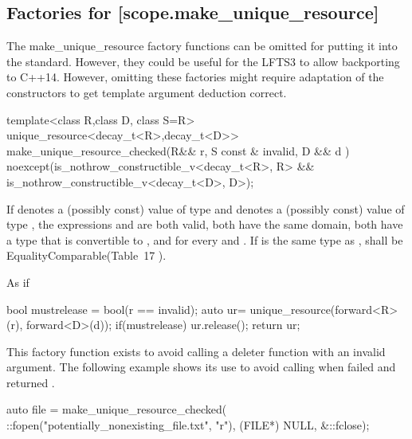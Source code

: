 \documentclass[ebook,11pt,article]{memoir}
\begin{document}
\subsection {Factories for  [scope.make_unique_resource]}

\begin{note}
The make_unique_resource factory functions can be omitted for putting it into the standard. However, they could be useful for the LFTS3 to allow backporting to C++14.
However, omitting these factories might require adaptation of the constructors to get template argument deduction correct.
\end{note}



\begin{itemdecl}
template<class R,class D, class S=R>
unique_resource<decay_t<R>,decay_t<D>>
make_unique_resource_checked(R&& r, S const & invalid, D && d ) 
noexcept(is_nothrow_constructible_v<decay_t<R>, R> &&
         is_nothrow_constructible_v<decay_t<D>, D>);
\end{itemdecl}

\begin{itemdescr}
\pnum
\requires 
If  denotes a (possibly const) value of type  and  denotes a
(possibly const) value of type , the expressions  and 
are both valid, both have the same domain, both have a type that is
convertible to , and  for every  and
. If  is the same type as ,  shall be EqualityComparable(Table~17
). 

\pnum
\effects As if
\begin{codeblock}
  bool mustrelease = bool(r == invalid);
  auto ur= unique_resource(forward<R>(r), forward<D>(d));
  if(mustrelease) ur.release();
  return ur;
\end{codeblock}

\pnum
\begin{note}
This factory function exists to avoid calling a deleter function with an invalid argument. The following example shows its use to avoid calling  when  failed and returned .
\end{note}

\pnum
\begin{example}
\begin{codeblock}
		auto file = make_unique_resource_checked(
		      ::fopen("potentially_nonexisting_file.txt", "r"), 
		      (FILE*) NULL, &::fclose);
\end{codeblock}
\end{example}


\end{itemdescr}
\end{document}
